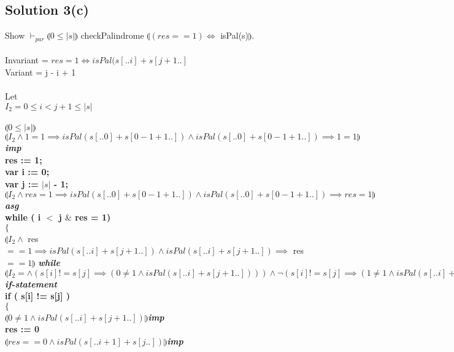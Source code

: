 \documentclass[12pt]{article}
\newcommand\abs[1]{\left|#1\right|}
\begin{document}
\subsection*{Solution 3(c)}
Show $\vdash_{par} \limg 0 \leq \abs{s} \rimg$ checkPalindrome $\limg (res==1)\iff$ isPal(s)$\rimg$. \\ \\
Invariant = $res = 1 \iff isPal(s[..i]+s[j+1..]$ \\
Variant = j - i + 1 \\ \\
Let \\
$I_2 = 0 \leq i < j + 1 \leq \abs{s}$ \\ \\
$\limg 0 \leq \abs{s} \rimg$ \\
$\limg I_2 \land 1 = 1 \implies isPal(s[..0]+s[0-1+1..]) \land isPal(s[..0]+s[0-1+1..]) \implies 1 = 1\rimg$ \textit{\textbf{imp}}\\
\textbf{res := 1;} \\
\textbf{var i := 0;} \\
\textbf{var j := $\abs{s}$ - 1;} \\
$\limg I_2 \land res = 1 \implies isPal(s[..0]+s[0-1+1..]) \land isPal(s[..0]+s[0-1+1..]) \implies res = 1 \rimg$ \textit{\textbf{asg}}\\ 
\textbf{while ( i $<$ j $\&$ res = 1)} \\
\textbf{$\{$} \\
\hspace*{10mm}$\limg I_2 \land$ res $== 1  \implies isPal(s[..i]+s[j+1..]) \land isPal(s[..i]+s[j+1..]) \implies $ res $==1 \rimg$ \textit{\textbf{while}}\\ 
\hspace*{10mm}$\limg I_2= \land (s[i] != s[j] \implies (0 \neq 1 \land isPal(s[..i]+s[j+1..]))) \land \neg(s[i] != s[j] \implies (1 \neq 1 \land isPal(s[..i]+s[j+1..]))) \rimg$ \textit{\textbf{if-statement}}\\
\hspace*{10mm}\textbf{if ( s[i] != s[j] )} \\
\hspace*{10mm}\textbf{$\{$} \\
\hspace*{20mm}$\limg 0 \neq 1 \land isPal(s[..i]+s[j+1..]) \rimg$\textit{\textbf{imp}}\\
\hspace*{20mm}\textbf{res := 0} \\
\hspace*{20mm}$\limg res==0 \land isPal(s[..i+1]+s[j..]) \rimg$\textit{\textbf{imp}}\\
\end{document}
